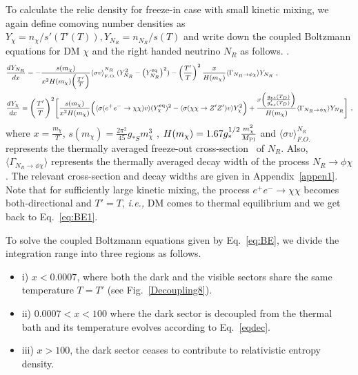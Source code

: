 \documentclass[prd,nofootinbib,preprint,superscriptaddress]{revtex4}
\begin{document}
		To calculate the relic density for freeze-in case with small kinetic mixing, we again define comoving number densities as $Y_{\chi}=n_{\chi}/s'(T'(T)), Y_{N_{R}} = n_{N_{R}}/s(T)$ and write down the coupled Boltzmann equations for DM $\chi$ and the right handed neutrino $N_{R}$ as follows. 
		.
		\begin{equation}
			\footnotesize{
				\begin{aligned}
					&\frac{dY_{N_R}}{dx}= -\frac{s(m_{\chi})}{x^2  H(m_{\chi})\Big( \frac{T'}{T}\Big)} \langle\sigma v \rangle^{^{N_R}}_{_{ \rm F.O.}} (Y^2_{N_R} -\big(Y^{\rm eq}_{N_R}\big)^2) -\left ( \frac{T'}{T}\right )^2\frac{x}{H(m_{\chi})}\langle \Gamma_{N_R \rightarrow \phi \chi}\rangle Y_{N_R} \,\, ,
					\\&
					\frac{dY_{\chi}}{dx}=\Bigg( \frac{T'}{T}\Bigg)^2\Bigg[\frac{s(m_{\chi})}{x^2  H(m_{\chi})} \Big(\langle\sigma(e^+ e^- \to \chi \chi) v\rangle (Y^{\rm eq}_{\chi})^2  - \langle\sigma(\chi\chi  \to Z' Z') v\rangle Y^2_{\chi} \Big)
					+ \frac{x\Big(\frac{g_{*s}(T_D)}{g'_{*s}(T_D)}\Big)}{H(m_{\chi})} \langle \Gamma_{N_R\rightarrow \phi \chi}\rangle Y_{N_R}\Bigg]\,\, ,
			\end{aligned}}
			\label{eq:BE}
		\end{equation}
		where $x=\frac{m_{\chi}}{T}$, $s(m_{\chi})= \frac{2\pi^2}{45}g_{*S}m^3_{\chi}$ , $H(m_{\chi})=1.67 g^{1/2}_*\frac{m^2_{\chi}}{M_{\rm Pl}}$ and $\langle \sigma v \rangle_{F.O.}^{N_R}$ represents the thermally averaged freeze-out cross-section~\cite{Gondolo:1990dk} of $N_R$. Also, $\langle \Gamma_{N_R\rightarrow \phi \chi}\rangle$ represents the thermally averaged decay width of the process $N_R \rightarrow \phi \chi$. The relevant cross-section and decay widths are given in Appendix~\ref{appen1}. Note that for sufficiently large kinetic mixing, the process $e^+ e^- \to \chi \chi$ becomes both-directional and $T'=T$, {\it i.e., } DM comes to thermal equilibrium and we get back to Eq.~\eqref{eq:BE1}.
		
		To solve the coupled Boltzmann equations given by Eq.~\eqref{eq:BE}, we divide the integration range into three regions as follows.
		
		\begin{itemize}
			\item i) $x < 0.0007$, where both the dark and the visible sectors share the same temperature $T=T'$ (see Fig.~\ref{Decoupling8}).
			\item ii) $0.0007<x<100$ where the dark sector is decoupled from the thermal bath and its temperature evolves according to Eq.~\eqref{eqdec}. 
			\item iii) $x>100$, the dark sector ceases to contribute to relativistic entropy density.
		\end{itemize}
		
\end{document}
